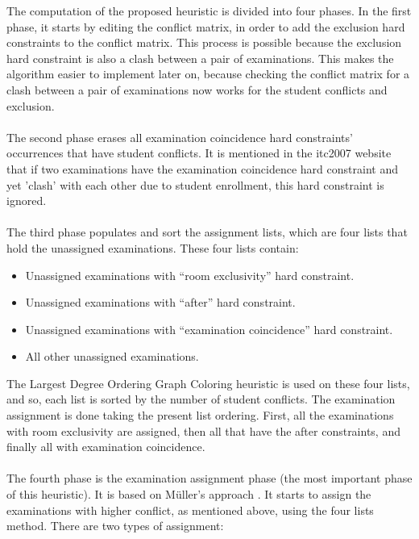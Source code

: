 The computation of the proposed heuristic is divided into four phases. In the first phase, it starts by editing the conflict matrix, in order to add the exclusion hard constraints to the conflict matrix. This process is possible because the exclusion hard constraint is also a clash between a pair of examinations. This makes the algorithm easier to implement later on, because checking the conflict matrix for a clash between a pair of examinations now works for the student conflicts and exclusion.\\
\\
The second phase erases all examination coincidence hard constraints' occurrences that have student conflicts. It is mentioned in the \gls{itc2007} website \cite{McCollum2007d} that if two examinations have the examination coincidence hard constraint and yet 'clash' with each other due to student enrollment, this hard constraint is ignored.\\
\\
The third phase populates and sort the assignment lists, which are four lists that hold the unassigned examinations. These four lists contain:
\begin{itemize}
	\item Unassigned examinations with ``room exclusivity'' hard constraint.
	\item Unassigned examinations with ``after'' hard constraint.
	\item Unassigned examinations with ``examination coincidence'' hard constraint.
	\item All other unassigned examinations.
\end{itemize}
The Largest Degree Ordering Graph Coloring heuristic is used on these four lists, and so, each list is sorted by the number of student conflicts. The examination assignment is done taking the present list ordering. First, all the examinations with room exclusivity are assigned, then all that have the after constraints, and finally all with examination coincidence.\\
\\
The fourth phase is the examination assignment phase (the most important phase of this heuristic). It is based on M\"{u}ller's approach \cite{Mueller2009}. It starts to assign the examinations with higher conflict, as mentioned above, using the four lists method. There are two types of assignment:
\\
